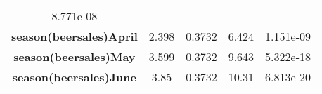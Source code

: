 \documentclass[]{book}
\theoremstyle{definition}
\theoremstyle{definition}
\theoremstyle{remark}
\begin{document}
\begin{longtable}[c]{@{}ccccc@{}}
\begin{minipage}[t]{0.11\columnwidth}
8.771e-08
\strut\end{minipage}\tabularnewline
\begin{minipage}[t]{0.37\columnwidth}\centering\strut
\textbf{season(beersales)April}
\strut\end{minipage} &
\begin{minipage}[t]{0.12\columnwidth}\centering\strut
2.398
\strut\end{minipage} &
\begin{minipage}[t]{0.14\columnwidth}\centering\strut
0.3732
\strut\end{minipage} &
\begin{minipage}[t]{0.11\columnwidth}\centering\strut
6.424
\strut\end{minipage} &
\begin{minipage}[t]{0.11\columnwidth}\centering\strut
1.151e-09
\strut\end{minipage}\tabularnewline
\begin{minipage}[t]{0.37\columnwidth}\centering\strut
\textbf{season(beersales)May}
\strut\end{minipage} &
\begin{minipage}[t]{0.12\columnwidth}\centering\strut
3.599
\strut\end{minipage} &
\begin{minipage}[t]{0.14\columnwidth}\centering\strut
0.3732
\strut\end{minipage} &
\begin{minipage}[t]{0.11\columnwidth}\centering\strut
9.643
\strut\end{minipage} &
\begin{minipage}[t]{0.11\columnwidth}\centering\strut
5.322e-18
\strut\end{minipage}\tabularnewline
\begin{minipage}[t]{0.37\columnwidth}\centering\strut
\textbf{season(beersales)June}
\strut\end{minipage} &
\begin{minipage}[t]{0.12\columnwidth}\centering\strut
3.85
\strut\end{minipage} &
\begin{minipage}[t]{0.14\columnwidth}\centering\strut
0.3732
\strut\end{minipage} &
\begin{minipage}[t]{0.11\columnwidth}\centering\strut
10.31
\strut\end{minipage} &
\begin{minipage}[t]{0.11\columnwidth}\centering\strut
6.813e-20
\strut\end{minipage}\tabularnewline

\end{longtable}
\end{document}

